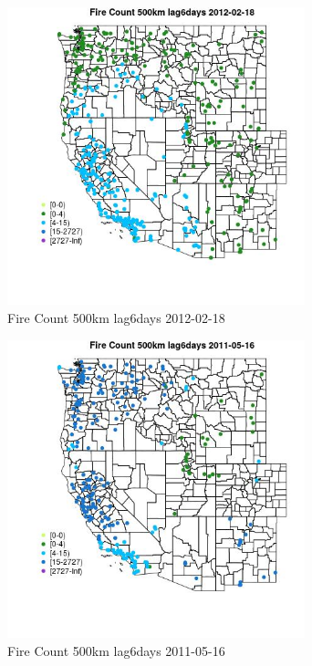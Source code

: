 \begin{figure} 
\centering  
\includegraphics[width=0.77\textwidth]{Code_Outputs/Report_ML_input_PM25_Step4_part_f_de_duplicated_aveswNAs_MapObsFire_Count_500km_lag6days2012-02-18.jpg} 
\caption{\label{fig:Report_ML_input_PM25_Step4_part_f_de_duplicated_aveswNAsMapObsFire_Count_500km_lag6days2012-02-18}Fire Count 500km lag6days 2012-02-18} 
\end{figure} 
 

\begin{figure} 
\centering  
\includegraphics[width=0.77\textwidth]{Code_Outputs/Report_ML_input_PM25_Step4_part_f_de_duplicated_aveswNAs_MapObsFire_Count_500km_lag6days2011-05-16.jpg} 
\caption{\label{fig:Report_ML_input_PM25_Step4_part_f_de_duplicated_aveswNAsMapObsFire_Count_500km_lag6days2011-05-16}Fire Count 500km lag6days 2011-05-16} 
\end{figure} 
 

